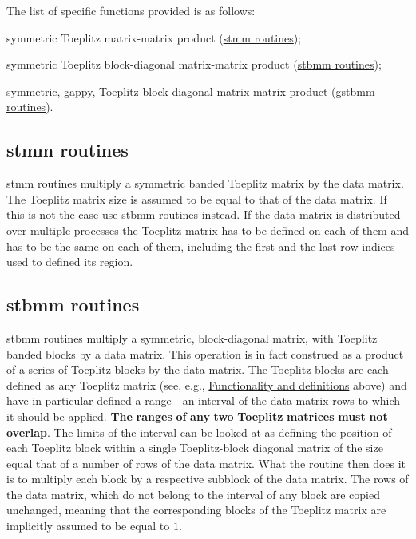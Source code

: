 The list of specific functions provided is as follows\-: \begin{DoxyItemize}
\item symmetric Toeplitz matrix-\/matrix product (\hyperlink{toeplitz_funct_stmm}{stmm routines}); \item symmetric Toeplitz block-\/diagonal matrix-\/matrix product (\hyperlink{toeplitz_funct_stbmm}{stbmm routines}); \item symmetric, gappy, Toeplitz block-\/diagonal matrix-\/matrix product (\hyperlink{toeplitz_funct_gstbmm}{gstbmm routines}). \end{DoxyItemize}
\subsection{stmm routines}\label{toeplitz_funct_stmm}
{\ttfamily stmm} routines multiply a symmetric banded Toeplitz matrix by the data matrix. The Toeplitz matrix size is assumed to be equal to that of the data matrix. If this is not the case use {\ttfamily stbmm} routines instead. If the data matrix is distributed over multiple processes the Toeplitz matrix has to be defined on each of them and has to be the same on each of them, including the first and the last row indices used to defined its region. \subsection{stbmm routines}\label{toeplitz_funct_stbmm}
{\ttfamily stbmm} routines multiply a symmetric, block-\/diagonal matrix, with Toeplitz banded blocks by a data matrix. This operation is in fact construed as a product of a series of Toeplitz blocks by the data matrix. The Toeplitz blocks are each defined as any Toeplitz matrix (see, e.\-g., \hyperlink{toeplitz_functionality}{Functionality and definitions} above) and have in particular defined a range -\/ an interval of the data matrix rows to which it should be applied. {\bfseries The} {\bfseries ranges} {\bfseries of} {\bfseries any} {\bfseries two} {\bfseries Toeplitz} {\bfseries matrices} {\bfseries must} {\bfseries not} {\bfseries overlap}. The limits of the interval can be looked at as defining the position of each Toeplitz block within a single Toeplitz-\/block diagonal matrix of the size equal that of a number of rows of the data matrix. What the routine then does it is to multiply each block by a respective subblock of the data matrix. The rows of the data matrix, which do not belong to the interval of any block are copied unchanged, meaning that the corresponding blocks of the Toeplitz matrix are implicitly assumed to be equal to $ 1 $.

